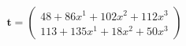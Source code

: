 \documentclass[preview]{standalone}
\begin{document}
\begin{align*}
\mathbf{t} = \begin{pmatrix}48 + 86x^{1} + 102x^{2} + 112x^{3} \\ 113 + 135x^{1} + 18x^{2} + 50x^{3}\end{pmatrix}
\end{align*}
\end{document}
